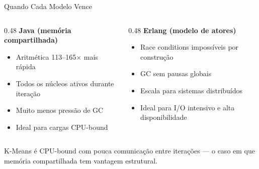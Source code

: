 \begin{frame}{Quando Cada Modelo Vence}
    \begin{columns}
        \begin{column}{0.48\textwidth}
            \textbf{Java (memória compartilhada)}
            \begin{itemize}
                \item[\cmark] Aritmética 113--165$\times$ mais rápida
                \item[\cmark] Todos os núcleos ativos durante iteração
                \item[\cmark] Muito menos pressão de GC
                \item[$\cdot$] Ideal para cargas CPU-bound
            \end{itemize}
        \end{column}
        \begin{column}{0.48\textwidth}
            \textbf{Erlang (modelo de atores)}
            \begin{itemize}
                \item[\cmark] Race conditions impossíveis por construção
                \item[\cmark] GC sem pausas globais
                \item[\cmark] Escala para sistemas distribuídos
                \item[$\cdot$] Ideal para I/O intensivo e alta disponibilidade
            \end{itemize}
        \end{column}
    \end{columns}

    \vspace{0.5em}
    K-Means é CPU-bound com pouca comunicação entre iterações ---
    \alert{o caso em que memória compartilhada tem vantagem estrutural}.
\end{frame}
